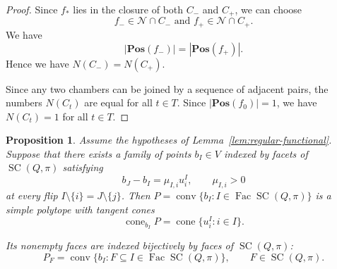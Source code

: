 \documentclass[11pt,a4paper]{article}
\newtheorem{proposition}[theorem]{Proposition}
\theoremstyle{definition}
\theoremstyle{remark}
\newcommand{\SC}{\operatorname{SC}}
\newcommand{\cone}{\operatorname{cone}}
\newcommand{\conv}{\operatorname{conv}}
\newcommand{\Fac}{\operatorname{Fac}}
\numberwithin{equation}{section}
\begin{document}
\begin{proof}
Since $f_*$ lies in the closure of both $C_-$ and $C_+$, we can choose
\[
f_-\in \mathcal N\cap C_- \text{ and } f_+\in \mathcal N\cap C_+.
\] We have
\[
|\mathbf{Pos}(f_-)|= |\mathbf{Pos}(f_+)|.
\]
Hence we have $N(C_-)=N(C_+)$.

Since any two chambers can be joined by a sequence of adjacent pairs,
the numbers $N(C_t)$ are equal for all $t\in T$. Since $|\mathbf{Pos}(f_0)|=1$, we have $N(C_t)=1$ for all $t\in T$.
\end{proof}

\begin{proposition}\label{prop:convexity-criterion}
Assume the hypotheses of Lemma~\ref{lem:regular-functional}.
Suppose that there exists a family of points $b_I\in V$ indexed by facets of $\SC(Q,\pi)$ satisfying
\begin{equation}\label{eq:abstract-edges}
b_J-b_I=\mu_{I,i}u_i^I,\qquad \mu_{I,i}>0
\end{equation}
at every flip $I\setminus\{i\}=J\setminus\{j\}$. Then $P=\conv\{b_I:I\in\Fac\SC (Q,\pi)\}$ is a simple polytope with tangent cones
\begin{equation}\label{eq:tangent-cone}
    \cone_{b_I}P=\cone\{u_i^I:i\in I\}.
\end{equation}

Its nonempty faces are indexed bijectively by faces of $\SC(Q,\pi)$:
\[
P_F=\conv\{b_I:F\subseteq I\in\Fac\SC (Q,\pi)\},\qquad F\in\SC (Q,\pi).
\]
\end{proposition}
\end{document}
